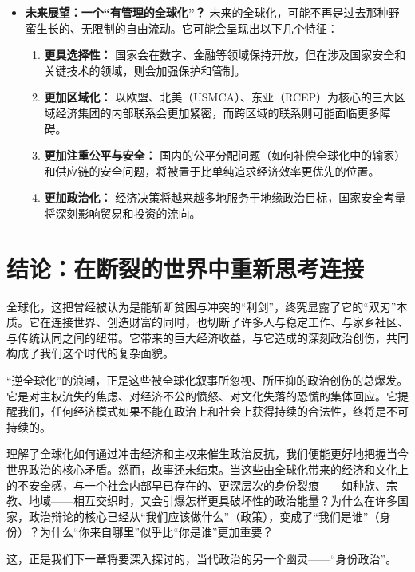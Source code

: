 \begin{itemize}
\item \textbf{未来展望：一个“有管理的全球化”？}
未来的全球化，可能不再是过去那种野蛮生长的、无限制的自由流动。它可能会呈现出以下几个特征：
\begin{enumerate}
\item \textbf{更具选择性：} 国家会在数字、金融等领域保持开放，但在涉及国家安全和关键技术的领域，则会加强保护和管制。
\item \textbf{更加区域化：} 以欧盟、北美（USMCA）、东亚（RCEP）为核心的三大区域经济集团的内部联系会更加紧密，而跨区域的联系则可能面临更多障碍。
\item \textbf{更加注重公平与安全：} 国内的公平分配问题（如何补偿全球化中的输家）和供应链的安全问题，将被置于比单纯追求经济效率更优先的位置。
\item \textbf{更加政治化：} 经济决策将越来越多地服务于地缘政治目标，国家安全考量将深刻影响贸易和投资的流向。
\end{enumerate}
\end{itemize}

\section{结论：在断裂的世界中重新思考连接}

全球化，这把曾经被认为是能斩断贫困与冲突的“利剑”，终究显露了它的“双刃”本质。它在连接世界、创造财富的同时，也切断了许多人与稳定工作、与家乡社区、与传统认同之间的纽带。它带来的巨大经济收益，与它造成的深刻政治创伤，共同构成了我们这个时代的复杂面貌。

“逆全球化”的浪潮，正是这些被全球化叙事所忽视、所压抑的政治创伤的总爆发。它是对主权流失的焦虑、对经济不公的愤怒、对文化失落的恐慌的集体回应。它提醒我们，任何经济模式如果不能在政治上和社会上获得持续的合法性，终将是不可持续的。

理解了全球化如何通过冲击经济和主权来催生政治反抗，我们便能更好地把握当今世界政治的核心矛盾。然而，故事还未结束。当这些由全球化带来的经济和文化上的不安全感，与一个社会内部早已存在的、更深层次的身份裂痕——如种族、宗教、地域——相互交织时，又会引爆怎样更具破坏性的政治能量？为什么在许多国家，政治辩论的核心已经从“我们应该做什么”（政策），变成了“我们是谁”（身份）？为什么“你来自哪里”似乎比“你是谁”更加重要？

这，正是我们下一章将要深入探讨的，当代政治的另一个幽灵——“身份政治”。
